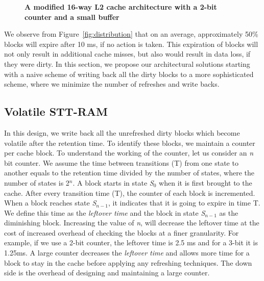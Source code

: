 
\begin{figure*} [t]
\center
 \caption{\label{fig:architecture} \scriptsize \bf A modified 16-way L2 cache architecture with a 2-bit counter and a small buffer}
\end{figure*}


We observe from Figure~\ref{fig:distribution} that on an average, approximately 50\% blocks will
expire after 10 ms, if no action is taken. This expiration of blocks will not only result in additional cache misses,
but also would
result in data loss, if they were dirty. In this section, we propose our architectural solutions starting with
a naive scheme of writing back
all the dirty blocks to a more sophisticated scheme, where we minimize the number of refreshes and write backs.

\subsection{{Volatile STT-RAM}}
In this design, we write back all the unrefreshed dirty blocks which become volatile after the retention time.
To identify these blocks,
we maintain a counter per cache block.  To understand the working of the counter, let us consider an {\it n} bit
counter. We assume the time between transitions (T) from one state to another equals to the retention time
divided by the number of states, where the number of states is 2$^n$.
A block starts in state {\it S$_0$} when it is first brought to the cache. After every transition time (T),
the counter of each block is incremented.
When a block reaches  state {\it S$_{n-1}$}, it indicates that it is going to expire in time T.
We define this time as the {\it leftover time} and the block in state {\it S$_{n-1}$} as  the diminishing block.
Increasing the value of {\it n}, will decrease the leftover time at the cost of increased overhead of checking
the blocks at a finer granularity.
For example, if we use a 2-bit counter, the leftover time is 2.5 ms and for a 3-bit it is 1.25ms.
A large counter decreases the {\it leftover time} and allows more time for a block to stay in the cache
before applying any refreshing techniques. The down side is the overhead of designing and maintaining a large counter.

